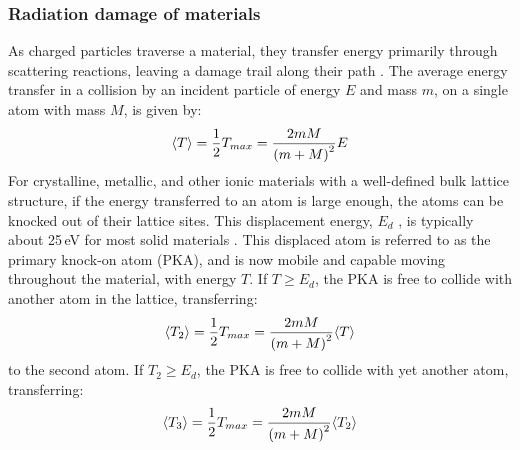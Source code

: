 \subsubsection{Radiation damage of materials}


As charged particles traverse a material, they transfer energy primarily through scattering reactions, leaving a damage trail along their path \cite{koutský2013radiation,krane1987introductory}.
The average energy transfer in a collision by an incident particle of energy $E$ and mass $m$, on a single atom
with mass $M$, is given by:
\begin{equation}
\langle T\rangle = \dfrac{1}{2}T_{max} = \dfrac{2mM}{\left( m+M\right)^2}E
\end{equation}
For crystalline, metallic, and other ionic materials with a  well-defined bulk  lattice structure, if the energy transferred to an atom  is large enough, the atoms can  be knocked out of their lattice sites.
This displacement energy, $E_d$ , is typically about 25\,eV for most solid materials \cite{olander1990fundamental}. 
This displaced atom is referred to as the primary knock-on atom (PKA), and is now mobile and capable moving throughout the material, with energy $T$. 
If $T \ge E_d$, the PKA is free to collide with another atom in the lattice, transferring:
\begin{equation}
\langle T_2\rangle = \dfrac{1}{2}T_{max} = \dfrac{2mM}{\left( m+M\right)^2}\langle T\rangle
\end{equation}
to the second atom. 
If $T_2 \ge E_d$, the PKA is free to collide with yet another atom, transferring:
\begin{equation}
\langle T_3\rangle = \dfrac{1}{2}T_{max} = \dfrac{2mM}{\left( m+M\right)^2}\langle T_2\rangle
\end{equation}


